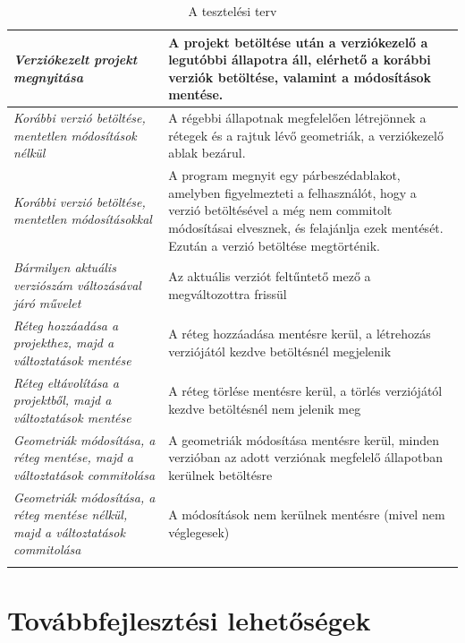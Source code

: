 \begin{center}
\begin{longtable}{ | p{} | p{} | }
		\emph{Verziókezelt projekt megnyitása}
		& A projekt betöltése után a verziókezelő a legutóbbi állapotra áll, elérhető a korábbi verziók betöltése, valamint a módosítások mentése.
		\\ \hline
		
		\emph{Korábbi verzió betöltése, mentetlen módosítások nélkül}
		& A régebbi állapotnak megfelelően létrejönnek a rétegek és a rajtuk lévő geometriák, a verziókezelő ablak bezárul.
		\\ \hline
		
		\emph{Korábbi verzió betöltése, mentetlen módosításokkal}
		& A program megnyit egy párbeszédablakot, amelyben figyelmezteti a felhasználót, hogy a verzió betöltésével a még nem commitolt módosításai elvesznek, és felajánlja ezek mentését. Ezután a verzió betöltése megtörténik.
		\\ \hline
		
		\emph{Bármilyen aktuális verziószám változásával járó művelet}
		& Az aktuális verziót feltűntető mező a megváltozottra frissül
		\\ \hline
		
		\emph{Réteg hozzáadása a projekthez, majd a változtatások mentése}
		& A réteg hozzáadása mentésre kerül, a létrehozás verziójától kezdve betöltésnél megjelenik
		\\ \hline
		
		\emph{Réteg eltávolítása a projektből, majd a változtatások mentése}
		& A réteg törlése mentésre kerül, a törlés verziójától kezdve betöltésnél nem jelenik meg
		\\ \hline
		
		\emph{Geometriák módosítása, a réteg mentése, majd a változtatások commitolása}
		& A geometriák módosítása mentésre kerül, minden verzióban az adott verziónak megfelelő állapotban kerülnek betöltésre
		\\ \hline
		
		\emph{Geometriák módosítása, a réteg mentése nélkül, majd a változtatások commitolása}
		& A módosítások nem kerülnek mentésre (mivel nem véglegesek)
		\\ \hline
		
		
		
		\caption{A tesztelési terv}
		\label{tab:example-3}		
	\end{longtable}
\end{center}

\section{Továbbfejlesztési lehetőségek}
